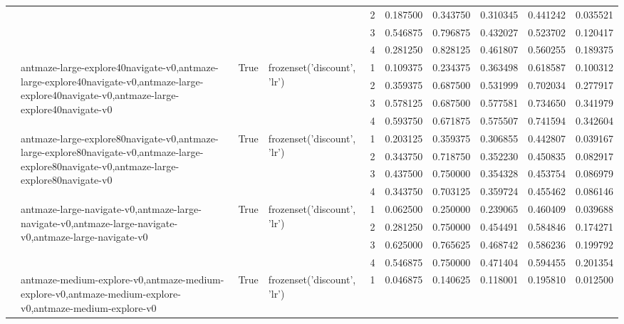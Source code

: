 \begin{tabular}{lllllrrrrr}
 &  &  &  & 2 & 0.187500 & 0.343750 & 0.310345 & 0.441242 & 0.035521 \\
 &  &  &  & 3 & 0.546875 & 0.796875 & 0.432027 & 0.523702 & 0.120417 \\
 &  &  &  & 4 & 0.281250 & 0.828125 & 0.461807 & 0.560255 & 0.189375 \\
\cline{2-10} \cline{3-10} \cline{4-10}
 & \multirow[t]{4}{*}{antmaze-large-explore40navigate-v0,antmaze-large-explore40navigate-v0,antmaze-large-explore40navigate-v0,antmaze-large-explore40navigate-v0} & \multirow[t]{4}{*}{True} & \multirow[t]{4}{*}{frozenset({'discount', 'lr'})} & 1 & 0.109375 & 0.234375 & 0.363498 & 0.618587 & 0.100312 \\
 &  &  &  & 2 & 0.359375 & 0.687500 & 0.531999 & 0.702034 & 0.277917 \\
 &  &  &  & 3 & 0.578125 & 0.687500 & 0.577581 & 0.734650 & 0.341979 \\
 &  &  &  & 4 & 0.593750 & 0.671875 & 0.575507 & 0.741594 & 0.342604 \\
\cline{2-10} \cline{3-10} \cline{4-10}
 & \multirow[t]{4}{*}{antmaze-large-explore80navigate-v0,antmaze-large-explore80navigate-v0,antmaze-large-explore80navigate-v0,antmaze-large-explore80navigate-v0} & \multirow[t]{4}{*}{True} & \multirow[t]{4}{*}{frozenset({'discount', 'lr'})} & 1 & 0.203125 & 0.359375 & 0.306855 & 0.442807 & 0.039167 \\
 &  &  &  & 2 & 0.343750 & 0.718750 & 0.352230 & 0.450835 & 0.082917 \\
 &  &  &  & 3 & 0.437500 & 0.750000 & 0.354328 & 0.453754 & 0.086979 \\
 &  &  &  & 4 & 0.343750 & 0.703125 & 0.359724 & 0.455462 & 0.086146 \\
\cline{2-10} \cline{3-10} \cline{4-10}
 & \multirow[t]{4}{*}{antmaze-large-navigate-v0,antmaze-large-navigate-v0,antmaze-large-navigate-v0,antmaze-large-navigate-v0} & \multirow[t]{4}{*}{True} & \multirow[t]{4}{*}{frozenset({'discount', 'lr'})} & 1 & 0.062500 & 0.250000 & 0.239065 & 0.460409 & 0.039688 \\
 &  &  &  & 2 & 0.281250 & 0.750000 & 0.454491 & 0.584846 & 0.174271 \\
 &  &  &  & 3 & 0.625000 & 0.765625 & 0.468742 & 0.586236 & 0.199792 \\
 &  &  &  & 4 & 0.546875 & 0.750000 & 0.471404 & 0.594455 & 0.201354 \\
\cline{2-10} \cline{3-10} \cline{4-10}
 & \multirow[t]{4}{*}{antmaze-medium-explore-v0,antmaze-medium-explore-v0,antmaze-medium-explore-v0,antmaze-medium-explore-v0} & \multirow[t]{4}{*}{True} & \multirow[t]{4}{*}{frozenset({'discount', 'lr'})} & 1 & 0.046875 & 0.140625 & 0.118001 & 0.195810 & 0.012500 \\

\end{tabular}
